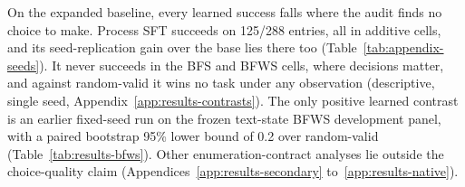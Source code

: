 \label{sec:results-primary}
\label{sec:results-boundary}
On the expanded baseline, every learned success falls where the audit finds no choice to make. Process SFT succeeds on 125/288 entries, all in additive cells, and its seed-replication gain over the base lies there too (Table~\ref{tab:appendix-seeds}). It never succeeds in the BFS and BFWS cells, where decisions matter, and against random-valid it wins no task under any observation (descriptive, single seed, Appendix~\ref{app:results-contrasts}). The only positive learned contrast is an earlier fixed-seed run on the frozen text-state BFWS development panel, with a paired bootstrap 95\% lower bound of 0.2 over random-valid (Table~\ref{tab:results-bfws}). Other enumeration-contract analyses lie outside the choice-quality claim (Appendices~\ref{app:results-secondary} to~\ref{app:results-native}).

